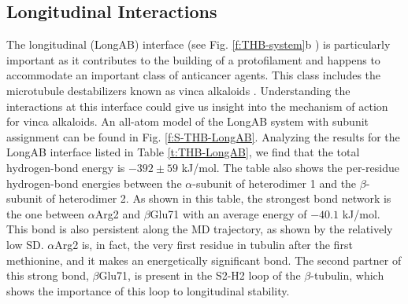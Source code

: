 \documentclass[11pt]{report}
\begin{document}
\subsection{Longitudinal Interactions}
\label{ss:THB-Results-longAB}

The longitudinal (LongAB) interface (see 
Fig. \ref{f:THB-system}b ) is particularly important as it contributes to the building of a protofilament and happens to accommodate an important class of anticancer agents. This class includes the microtubule destabilizers known as vinca alkaloids
\cite{Gigant2005,Toso1993}. 
Understanding the interactions at this interface could give us insight into the mechanism of action for vinca alkaloids. An all-atom model of the LongAB system with subunit assignment can be found in 
Fig. \ref{f:S-THB-LongAB}. 
Analyzing the results for the LongAB interface listed in 
Table \ref{t:THB-LongAB}, 
we find that the total hydrogen-bond energy is $-392\pm59$ kJ/mol. The table also shows the per-residue hydrogen-bond energies between the $\alpha$-subunit of heterodimer 1 and the $\beta$-subunit of heterodimer 2. As shown in this table, the strongest bond network is the one between $\alpha$Arg2 and $\beta$Glu71 with an average energy of $-40.1$ kJ/mol. This bond is also persistent along the MD trajectory, as shown by the relatively low SD. $\alpha$Arg2 is, in fact, the very first residue in tubulin after the first methionine, and it makes an energetically significant bond. The second partner of this strong bond, $\beta$Glu71, is present in the S2-H2 loop of the $\beta$-tubulin, which shows the importance of this loop to longitudinal stability. 
\end{document}
